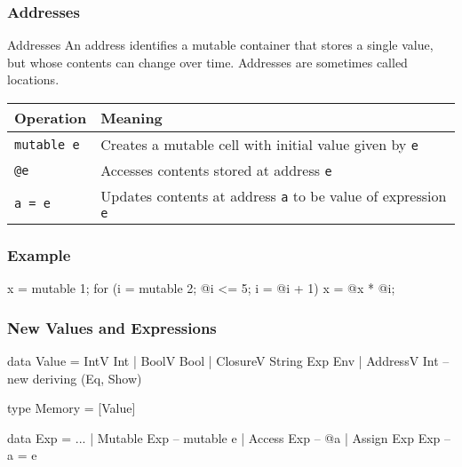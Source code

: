 \documentclass[xcolor=pdftex,dvipsnames,table]{beamer}
\begin{document}
\begin{frame}[fragile]
\frametitle{Addresses}

\begin{block}{Addresses}
An address identifies a mutable container that stores a single value, but whose contents can change over time. Addresses are sometimes called locations.
\end{block}

\vfill

\pause

\begin{tabular}{l|l}
Operation & Meaning
\\
\hline\hline
\verb+mutable e+ & Creates a mutable cell with initial value given by \verb+e+
\\
\verb+@e+	& Accesses contents stored at address \verb+e+
\\
\verb+a = e+ & Updates contents at address \verb+a+ to be value of expression \verb+e+
\end{tabular}

\end{frame}

\begin{frame}[fragile]
\frametitle{Example}

\begin{hcode}
x = mutable 1;
for (i = mutable 2; @i <= 5; i = @i + 1) {
  x = @x * @i;
}
\end{hcode}

\end{frame}

\begin{frame}[fragile]
\frametitle{New Values and Expressions}

\begin{hcode}
data Value = IntV  Int
           | BoolV Bool
           | ClosureV String Exp Env
           | AddressV Int        -- new
  deriving (Eq, Show)

type Memory = [Value]
\end{hcode}

\pause

\begin{hcode}
data Exp = ...
         | Mutable   Exp        -- mutable e
         | Access    Exp        -- @a
         | Assign    Exp Exp    -- a = e
\end{hcode}         

\end{frame}
\end{document}
